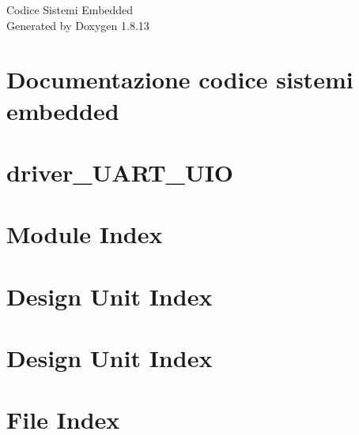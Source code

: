 \documentclass[twoside]{book}
\newcommand{\+}{\discretionary{\mbox{\scriptsize$\hookleftarrow$}}{}{}}
\newcommand{\clearemptydoublepage}{%
  \newpage{\pagestyle{empty}\cleardoublepage}%
}
\begin{document}
\hypersetup{pageanchor=false,
             bookmarksnumbered=true,
             pdfencoding=unicode
            }
\begin{titlepage}
\vspace*{7cm}
\begin{center}%
{\Large Codice Sistemi Embedded }\\
\vspace*{1cm}
{\large Generated by Doxygen 1.8.13}\\
\end{center}
\end{titlepage}
\clearemptydoublepage
{}
\tableofcontents
\clearemptydoublepage
{}
\hypersetup{pageanchor=true}

\chapter{Documentazione codice sistemi embedded}
\label{index}\hypertarget{index}{}
\chapter{driver\+\_\+\+U\+A\+R\+T\+\_\+\+U\+IO}
\label{driver_UART_UIO}

\chapter{Module Index}

\chapter{Design Unit Index}

\chapter{Design Unit Index}

\chapter{File Index}

\end{document}

